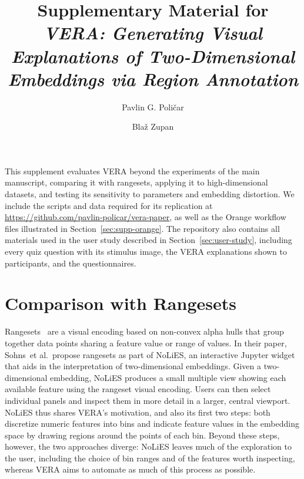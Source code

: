 \documentclass[10pt]{article}
\title{Supplementary Material for\\
\textit{VERA: Generating Visual Explanations of Two-Dimensional Embeddings
via Region Annotation}}
\author{Pavlin G. Poli\v{c}ar \and Bla\v{z} Zupan}
\date{}
\newcommand{\etal}{et al.}
\begin{document}
\maketitle

\medskip
\noindent This supplement evaluates VERA beyond the experiments of the main manuscript, comparing it with rangesets, applying it to high-dimensional datasets, and testing its sensitivity to parameters and embedding distortion. We include the scripts and data required for its replication at \url{https://github.com/pavlin-policar/vera-paper}, as well as the Orange workflow files illustrated in Section~\ref{sec:supp-orange}. The repository also contains all materials used in the user study described in Section~\ref{sec:user-study}, including every quiz question with its stimulus image, the VERA explanations shown to participants, and the questionnaires.


\section{Comparison with Rangesets}
\label{sec:supp-rangesets}

Rangesets~\cite{Sohns2022} are a visual encoding based on non-convex alpha hulls that group together data points sharing a feature value or range of values.
In their paper, Sohns~\etal\ propose rangesets as part of NoLiES, an interactive Jupyter widget that aids in the interpretation of two-dimensional embeddings.
Given a two-dimensional embedding, NoLiES produces a small multiple view showing each available feature using the rangeset visual encoding. Users can then select individual panels and inspect them in more detail in a larger, central viewport.
NoLiES thus shares VERA's motivation, and also its first two steps: both discretize numeric features into bins and indicate feature values in the embedding space by drawing regions around the points of each bin.
Beyond these steps, however, the two approaches diverge: NoLiES leaves much of the exploration to the user, including the choice of bin ranges and of the features worth inspecting, whereas VERA aims to automate as much of this process as possible.
\end{document}
